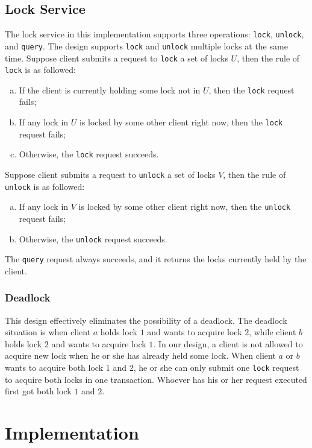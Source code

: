 \documentclass{article}
\numberwithin{equation}{section}
\begin{document}
\subsection{Lock Service}\label{sec:lockservice}
The lock service in this implementation supports three operations: \verb|lock|, \verb|unlock|, and \verb|query|. The design supports \verb|lock| and \verb|unlock| multiple locks at the same time. Suppose client submits a request to \verb|lock| a set of locks $U$, then the rule of \verb|lock| is as followed:
\begin{enumerate}[(a)]
	\item If the client is currently holding some lock not in $U$, then the \verb|lock| request fails;
	\item If any lock in $U$ is locked by some other client right now, then the \verb|lock| request fails;
	\item Otherwise, the \verb|lock| request succeeds.
\end{enumerate}
Suppose client submits a request to \verb|unlock| a set of locks $V$, then the rule of \verb|unlock| is as followed:
\begin{enumerate}[(a)]
	\item If any lock in $V$ is locked by some other client right now, then the \verb|unlock| request fails;
	\item Otherwise, the \verb|unlock| request succeeds.
\end{enumerate}
The \verb|query| request always succeeds, and it returns the locks currently held by the client.

\subsubsection{Deadlock}
This design effectively eliminates the possibility of a deadlock. The deadlock situation is when client $a$ holds lock $1$ and wants to acquire lock $2$, while client $b$ holds lock $2$ and wants to acquire lock $1$. In our design, a client is not allowed to acquire new lock when he or she has already held some lock. When client $a$ or $b$ wants to acquire both lock $1$ and $2$, he or she can only submit one \verb|lock| request to acquire both locks in one transaction. Whoever has his or her request executed first got both lock $1$ and $2$.

\section{Implementation}
\end{document}
